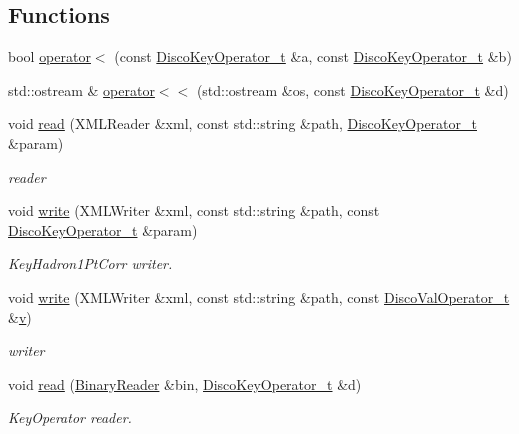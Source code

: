 \subsection*{Functions}
\begin{DoxyCompactItemize}
\item 
bool \mbox{\hyperlink{namespaceFF_a84e77b5ad9222ac85655c36949abf276}{operator$<$}} (const \mbox{\hyperlink{structFF_1_1DiscoKeyOperator__t}{Disco\+Key\+Operator\+\_\+t}} \&a, const \mbox{\hyperlink{structFF_1_1DiscoKeyOperator__t}{Disco\+Key\+Operator\+\_\+t}} \&b)
\item 
std\+::ostream \& \mbox{\hyperlink{namespaceFF_ac2ee6d46f8316f1f3631105fbeab604c}{operator$<$$<$}} (std\+::ostream \&os, const \mbox{\hyperlink{structFF_1_1DiscoKeyOperator__t}{Disco\+Key\+Operator\+\_\+t}} \&d)
\item 
void \mbox{\hyperlink{namespaceFF_a4e59e8e764d20bb787e2992c247ca80f}{read}} (X\+M\+L\+Reader \&xml, const std\+::string \&path, \mbox{\hyperlink{structFF_1_1DiscoKeyOperator__t}{Disco\+Key\+Operator\+\_\+t}} \&param)
\begin{DoxyCompactList}\small\item\em reader \end{DoxyCompactList}\item 
void \mbox{\hyperlink{namespaceFF_a831b58b450a964b114e0fce65fc4de99}{write}} (X\+M\+L\+Writer \&xml, const std\+::string \&path, const \mbox{\hyperlink{structFF_1_1DiscoKeyOperator__t}{Disco\+Key\+Operator\+\_\+t}} \&param)
\begin{DoxyCompactList}\small\item\em Key\+Hadron1\+Pt\+Corr writer. \end{DoxyCompactList}\item 
void \mbox{\hyperlink{namespaceFF_a0c22ea2c009e3006aa0f745b9a3e2cc2}{write}} (X\+M\+L\+Writer \&xml, const std\+::string \&path, const \mbox{\hyperlink{classFF_1_1DiscoValOperator__t}{Disco\+Val\+Operator\+\_\+t}} \&\mbox{\hyperlink{hadron__timeslice_8cc_a716fc87f5e814be3ceee2405ed6ff22a}{v}})
\begin{DoxyCompactList}\small\item\em writer \end{DoxyCompactList}\item 
void \mbox{\hyperlink{namespaceFF_a90d854af01e30d52191dff4341fcd4ad}{read}} (\mbox{\hyperlink{classADATIO_1_1BinaryReader}{Binary\+Reader}} \&bin, \mbox{\hyperlink{structFF_1_1DiscoKeyOperator__t}{Disco\+Key\+Operator\+\_\+t}} \&d)
\begin{DoxyCompactList}\small\item\em Key\+Operator reader. \end{DoxyCompactList}\item 

\end{DoxyCompactItemize}
